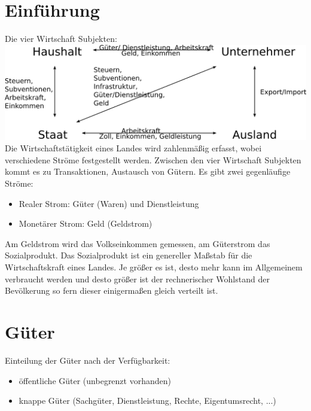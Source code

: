 \documentclass[a4paper]{report}
\begin{document}
\chapter{Einführung}

Die  vier Wirtschaft Subjekten:
\newline
\newline
\newline
\newline
\includegraphics[scale=0.8]{image/image1.png}
\newline
\newline
\newline
\newline
Die Wirtschaftstätigkeit eines Landes wird zahlenmäßig erfasst, wobei verschiedene Ströme festgestellt werden. Zwischen den vier Wirtschaft Subjekten kommt es zu Transaktionen, Austausch von Gütern. Es gibt zwei gegenläufige Ströme:

\begin{itemize}
\item Realer Strom: Güter (Waren) und Dienstleistung
\item Monetärer Strom: Geld (Geldstrom)
\end{itemize}

Am Geldstrom wird das Volkseinkommen gemessen, am Güterstrom das Sozialprodukt. Das Sozialprodukt ist ein genereller Maßstab für die Wirtschaftskraft eines Landes. Je größer es ist, desto mehr kann im Allgemeinem verbraucht werden und desto größer ist der rechnerischer Wohlstand der Bevölkerung so fern dieser einigermaßen gleich verteilt ist.

\chapter{Güter}

Einteilung der Güter nach der Verfügbarkeit:

\begin{itemize}
\item öffentliche Güter (unbegrenzt vorhanden)
\item knappe Güter (Sachgüter, Dienstleistung, Rechte, Eigentumsrecht, ...)
\end{itemize}
\end{document}
